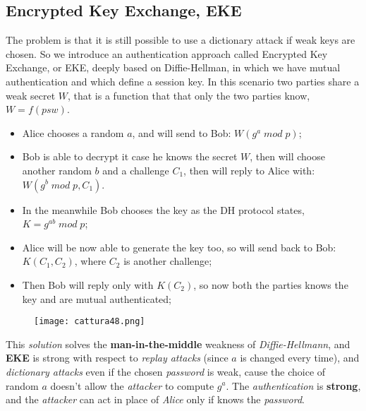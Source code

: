 \documentclass{article}
\begin{document}
\subsection{Encrypted Key Exchange, EKE}
The problem is that it is still possible to use a dictionary attack if weak keys are chosen. So we introduce an authentication approach called Encrypted Key Exchange, or EKE, deeply based on Diffie-Hellman, in which we have mutual authentication and which define a session key. In this scenario two parties share a weak secret $W$, that is a function that that only the two parties know, $W = f(psw)$. 
\begin{itemize}
\item Alice chooses a random $a$, and will send to Bob: $W(g^a\; mod\; p)$;
\item Bob is able to decrypt it case he knows the secret $W$, then will choose another random $b$ and a challenge $C_1$, then will reply to Alice with: $W(g^b\; mod\; p,  C_1)$.
\item In the meanwhile Bob chooses the key as the DH protocol states, $K= g^{ab}\;mod\; p$;
\item Alice will be now able to generate the key too, so will send back to Bob: $K(C_1,C_2)$, where $C_2$ is another challenge;
\item Then Bob will reply only with $K(C_2)$, so now both the parties knows the key and are mutual authenticated;
\end{itemize}
\begin{figure}[H]
  \centering
  \texttt{[image: cattura48.png]}
\end{figure}
This \emph{solution} solves the \textbf{man-in-the-middle} weakness of \emph{Diffie-Hellmann}, and \textbf{EKE} is strong with respect to \emph{replay attacks} (since $a$ is changed every time), and \emph{dictionary attacks} even if the chosen \emph{password} is weak, cause the choice of random $a$ doesn't allow the \emph{attacker} to compute $g^a$. The \emph{authentication} is \textbf{strong}, and the \emph{attacker} can act in place of \emph{Alice} only if knows the \emph{password}. 
\end{document}
